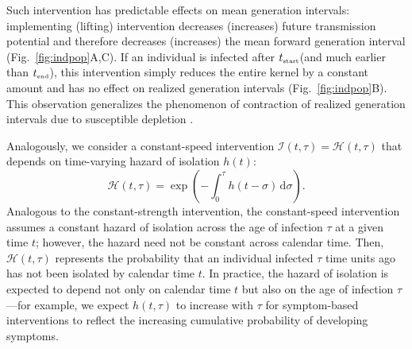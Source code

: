 \documentclass[12pt]{article}
\newcommand{\fref}[1]{Fig.~\ref{fig:#1}}
\newcommand{\tsub}[2]{#1_{{\textrm{\tiny #2}}}}
\newcommand{\dd}[1]{\ensuremath{\, \mathrm{d}#1}}
\newcommand{\dsigma}{\dd{\sigma}}
\newcommand{\tstart}{\ensuremath{\tsub{t}{start}}\xspace}
\newcommand{\tend}{\ensuremath{\tsub{t}{end}}\xspace}
\newcommand{\II}{\ensuremath{\mathcal I}}
\newcommand{\HH}{\ensuremath{\mathcal H}}
\begin{document}
Such intervention has predictable effects on mean generation intervals:
implementing (lifting) intervention decreases (increases) future transmission potential and therefore decreases (increases) the mean forward generation interval (\fref{indpop}A,C).
If an individual is infected after \tstart (and much earlier than \tend), this intervention simply reduces the entire kernel by a constant amount and has no effect on realized generation intervals (\fref{indpop}B).
This observation generalizes the phenomenon of contraction of realized generation intervals due to susceptible depletion \citep{kenah2008generation,nishiura2010time,champredon2015intrinsic}.

Analogously, we consider a constant-speed intervention $\II(t, \tau) = \HH(t, \tau)$ that depends on time-varying hazard of isolation $h(t)$:
\begin{equation}
\HH(t, \tau) = \exp \left(- \int_0^\tau h(t-\sigma) \dsigma \right).
\end{equation}
Analogous to the constant-strength intervention, the constant-speed intervention assumes a constant hazard of isolation across the age of infection $\tau$ at a given time $t$; however, the hazard need not be constant across calendar time.
Then, $\HH(t,\tau)$ represents the probability that an individual infected $\tau$ time units ago has not been isolated by calendar time $t$.
In practice, the hazard of isolation is expected to depend not only on calendar time $t$ but also on the age of infection $\tau$---for example, we expect $h(t, \tau)$ to increase with $\tau$ for symptom-based interventions to reflect the increasing cumulative probability of developing symptoms.
\end{document}
